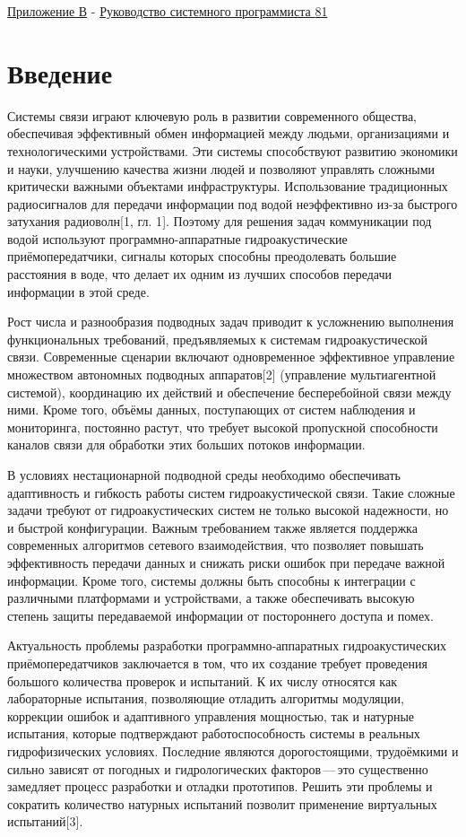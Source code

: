\hyperref[_Toc167813696]{Приложение В} -
\hyperref[_Toc167813697]{Руководство системного программиста
\hyperref[_Toc167813697]{81}}

\section*{Введение}\label{ux432ux432ux435ux434ux435ux43dux438ux435}

Системы связи играют ключевую роль в развитии современного общества,
обеспечивая эффективный обмен информацией между людьми, организациями и
технологическими устройствами. Эти системы способствуют развитию
экономики и науки, улучшению качества жизни людей и позволяют управлять
сложными критически важными объектами инфраструктуры. Использование
традиционных радиосигналов для передачи информации под водой
неэффективно из-за быстрого затухания радиоволн{[}1, гл. 1{]}. Поэтому
для решения задач коммуникации под водой используют
программно-аппаратные гидроакустические приёмопередатчики, сигналы
которых способны преодолевать большие расстояния в воде, что делает их
одним из лучших способов передачи информации в этой среде.

Рост числа и разнообразия подводных задач приводит к усложнению
выполнения функциональных требований, предъявляемых к системам
гидроакустической связи. Современные сценарии включают одновременное
эффективное управление множеством автономных подводных аппаратов{[}2{]}
(управление мультиагентной системой), координацию их действий и
обеспечение бесперебойной связи между ними. Кроме того, объёмы данных,
поступающих от систем наблюдения и мониторинга, постоянно растут, что
требует высокой пропускной способности каналов связи для обработки этих
больших потоков информации.

В условиях нестационарной подводной среды необходимо обеспечивать
адаптивность и гибкость работы систем гидроакустической связи. Такие
сложные задачи требуют от гидроакустических систем не только высокой
надежности, но и быстрой конфигурации. Важным требованием также является
поддержка современных алгоритмов сетевого взаимодействия, что позволяет
повышать эффективность передачи данных и снижать риски ошибок при
передаче важной информации. Кроме того, системы должны быть способны к
интеграции с различными платформами и устройствами, а также обеспечивать
высокую степень защиты передаваемой информации от постороннего доступа и
помех.

Актуальность проблемы разработки программно‑аппаратных гидроакустических
приёмопередатчиков заключается в том, что их создание требует проведения
большого количества проверок и испытаний. К их числу относятся как
лабораторные испытания, позволяющие отладить алгоритмы модуляции,
коррекции ошибок и адаптивного управления мощностью, так и натурные
испытания, которые подтверждают работоспособность системы в реальных
гидрофизических условиях. Последние являются дорогостоящими, трудоёмкими
и сильно зависят от погодных и гидрологических факторов\,---\,это
существенно замедляет процесс разработки и отладки прототипов. Решить
эти проблемы и сократить количество натурных испытаний позволит
применение виртуальных испытаний{[}3{]}.

